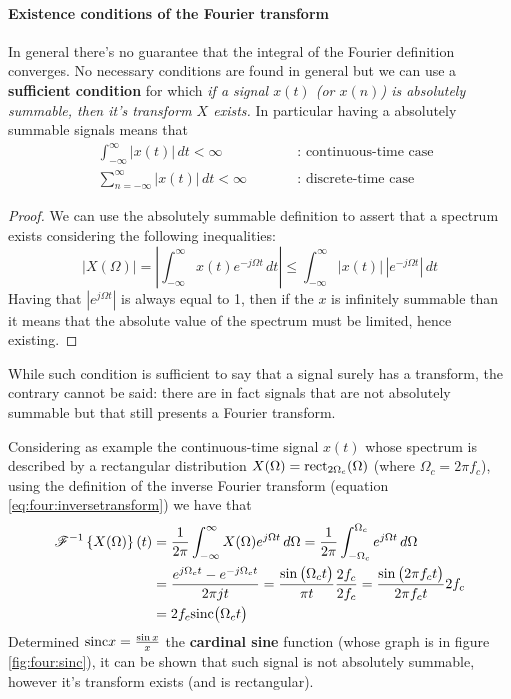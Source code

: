 	\paragraph{Existence conditions of the Fourier transform} \label{sec:four:sufficient} In general there's no guarantee that the integral of the Fourier definition converges. No necessary conditions are found in general but we can use a \textbf{sufficient condition} for which {\itshape if a signal $x(t)$ (or $x(n)$) is absolutely summable, then it's transform $X$ exists.} In particular having a absolutely summable signals means that
	\begin{align*}
		& \int_{-\infty}^\infty |x(t)|\, dt < \infty  && \textrm{: continuous-time case} \\
		& \sum_{n=-\infty}^\infty |x(t)|\, dt < \infty \qquad && \textrm{: discrete-time case}
	\end{align*}

	\begin{proof}
		We can use the absolutely summable definition to assert that a spectrum exists considering the following inequalities:
		\[|X(\Omega)| = \left| \int_{-\infty}^\infty x(t) e^{-j\Omega t}\, dt \right| \leq \int_{-\infty}^\infty |x(t)|\, \left|e^{-j\Omega t}\right| \, dt\]
		Having that $|e^{j\Omega t}|$ is always equal to 1, then if the $x$ is infinitely summable than it means that the absolute value of the spectrum must be limited, hence existing.
	\end{proof} \noindent

	While such condition is sufficient to say that a signal surely has a transform, the contrary cannot be said: there are in fact signals that are not absolutely summable but that still presents a Fourier transform.
	
	Considering as example the continuous-time signal $x(t)$ whose spectrum is described by a rectangular distribution $X(\Omega) = \textrm{rect}_{2\Omega_c} (\Omega)$ (where $\Omega_c = 2\pi f_c$), using the definition of the inverse Fourier transform (equation \ref{eq:four:inversetransform}) we have that
	\begin{equation} \label{eq:four:rectangularinvers}
	\begin{aligned}
		\mathscr{F}^{-1}\left\{ X(\Omega) \right\}(t) & = \frac 1 {2\pi} \int_{-\infty}^\infty X(\Omega) e^{j\Omega t}\, d\Omega = \frac 1 {2\pi} \int_{-\Omega_c}^{\Omega_c} e^{j\Omega t}\, d\Omega \\
		& = \frac{e^{j\Omega_c t} - e^{-j\Omega_c t}}{2\pi j t} = \frac{\sin\big(\Omega_c t\big)}{\pi t} \frac{2f_c}{2f_c} = \frac{\sin\big(2\pi f_c t\big)}{2\pi f_c t} 2f_c  \\ 
		& = 2 f_c \textrm{sinc}\big(\Omega_c t\big)
	\end{aligned}
	\end{equation}
	Determined $\textrm{sinc} x = \frac{\sin x}{x}$ the \textbf{cardinal sine} function (whose graph is in figure \ref{fig:four:sinc}), it can be shown that such signal is not absolutely summable, however it's transform exists (and is rectangular).
	
